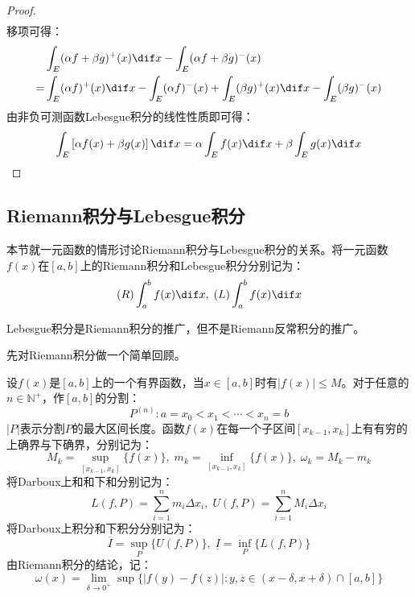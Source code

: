 \begin{proof}
\begin{align*}
	\end{align*}
	移项可得：
	\begin{align*}
		&\int_{E}(\alpha f+\beta g)^+(x)\dif x-\int_{E}(\alpha f+\beta g)^-(x) \\
		=&\int_{E}(\alpha f)^+(x)\dif x-\int_{E}(\alpha f)^-(x)+\int_{E}(\beta g)^+(x)\dif x-\int_{E}(\beta g)^-(x)
	\end{align*}
	由非负可测函数Lebesgue积分的线性性质即可得：
	\begin{equation*}
		\int_{E}\left[\alpha f(x)+\beta g(x)\right]\dif x=\alpha\int_{E}f(x)\dif x+\beta\int_{E}g(x)\dif x\qedhere
	\end{equation*}
\end{proof}

\subsection{Riemann积分与Lebesgue积分}
本节就一元函数的情形讨论Riemann积分与Lebesgue积分的关系。将一元函数$f(x)$在$[a,b]$上的Riemann积分和Lebesgue积分分别记为：
\begin{equation*}
	(R)\int_{a}^{b}f(x)\dif x,\;(L)\int_{a}^{b}f(x)\dif x
\end{equation*}\par
Lebesgue积分是Riemann积分的推广，但不是Riemann反常积分的推广。\par
先对Riemann积分做一个简单回顾。\par
设$f(x)$是$[a,b]$上的一个有界函数，当$x\in[a,b]$时有$|f(x)|\leqslant M$。对于任意的$n\in\mathbb{N}^+$，作$[a,b]$的分割：
\begin{equation*}
	P^{(n)}:a=x_0<x_1<\cdots<x_n=b
\end{equation*}
$|P|$表示分割$P$的最大区间长度。函数$f(x)$在每一个子区间$[x_{k-1},x_k]$上有有穷的上确界与下确界，分别记为：
\begin{equation*}
	M_k=\sup_{[x_{k-1},x_k]}\{f(x)\},\;m_k=\inf_{[x_{k-1},x_k]}\{f(x)\},\;\omega_k=M_k-m_k
\end{equation*}
将Darboux上和和下和分别记为：
\begin{equation*}
	L(f,P)=\sum_{i=1}^{n}m_i\Delta x_i,\;	U(f,P)=\sum_{i=1}^{n}M_i\Delta x_i
\end{equation*}
将Darboux上积分和下积分分别记为：
\begin{equation*}
	\overline{I}=\sup_P\{U(f,P)\},\;
	\underline{I}=\inf_P\{L(f,P)\}
\end{equation*}
由Riemann积分的结论，记：
\begin{equation*}
	\omega(x)=\lim_{\delta\to0^+}\sup\{|f(y)-f(z)|:y,z\in(x-\delta,x+\delta)\cap[a,b]\}
\end{equation*}
